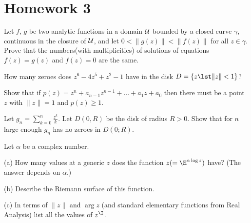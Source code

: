 \section*{Homework 3}\renewcommand{\leftmark}{Homework 3}
\begin{exercise}
Let $f$, $g$ be two analytic functions in a domain ${\cal U}$
bounded by a closed curve $\gamma$, continuous in the closure of
${\cal U}$, and let $0 < \|g(z)\| < \|f (z)\|$ for all
$z\in\gamma$. Prove that the numbers(with multiplicities) of
solutions of equations $f (z) = g(z)$ and $f (z) = 0$ are the
same. 
\end{exercise}
\begin{exercise}
How many zeroes does $z^{6} - 4z^{5} + z^{2} - 1$ have in the disk $D = \{z \lst \|z\| < 1\}$?
\end{exercise}
\begin{exercise}
Show that if $p(z) = z^{n} + a_{n-1} z^{n-1} + \dots + a_{1} z + a_{0}$ then there must be a point $z$
with $\|z\| = 1$ and $p(z)\geq1$.
\end{exercise}
\begin{exercise}
Let $\displaystyle g_{n}=\sum^{n}_{k=0}\frac{z^{k}}{k}$. Let
$D(0, R)$ be the disk of radius $R > 0$. Show that for $n$ large
enough $g_{n}$ has no zeroes in $D(0; R)$. 
\end{exercise}
\begin{exercise}
Let $\alpha$ be a complex number. 

(a) How many values at a generic $z$ does the function
$z (= \E^{\alpha \log z} )$ have? (The answer depends on $\alpha$.) 

(b) Describe the Riemann surface of this function. 

(c) In terms of $\|z\|$ and $\arg z$ (and standard elementary
functions from Real Analysis) list all the values of $z^{\I}$. 
\end{exercise}
